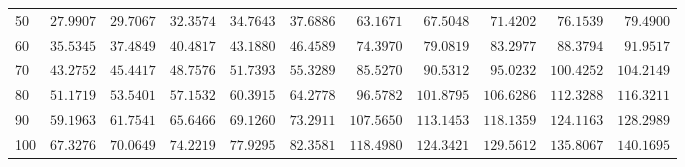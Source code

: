 \begin{center}
\begin{tabular}{l|rrrrrrrrrr}
50&$27.9907$&$29.7067$&$32.3574$&$34.7643$&$37.6886$&$ 63.1671$&$ 67.5048$&$ 71.4202$&$ 76.1539$&$ 79.4900$\\
60&$35.5345$&$37.4849$&$40.4817$&$43.1880$&$46.4589$&$ 74.3970$&$ 79.0819$&$ 83.2977$&$ 88.3794$&$ 91.9517$\\
70&$43.2752$&$45.4417$&$48.7576$&$51.7393$&$55.3289$&$ 85.5270$&$ 90.5312$&$ 95.0232$&$100.4252$&$104.2149$\\
80&$51.1719$&$53.5401$&$57.1532$&$60.3915$&$64.2778$&$ 96.5782$&$101.8795$&$106.6286$&$112.3288$&$116.3211$\\
90&$59.1963$&$61.7541$&$65.6466$&$69.1260$&$73.2911$&$107.5650$&$113.1453$&$118.1359$&$124.1163$&$128.2989$\\
100&$67.3276$&$70.0649$&$74.2219$&$77.9295$&$82.3581$&$118.4980$&$124.3421$&$129.5612$&$135.8067$&$140.1695$\\
\hline
\end{tabular}
\end{center}

